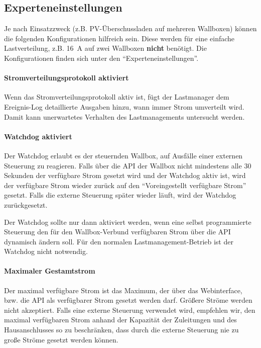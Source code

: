 \documentclass[a4paper,10pt]{article}
\newcommand{\hint}[1]{\begin{tcolorbox}[colback=boxgray,colframe=black,coltext=
white,title=Hinweis,left*=2mm,right*=2mm,boxsep=1mm,bottom=1mm,top=1mm]#1\end{tcolorbox}}
\begin{document}
\begin{multicols*}{2}
    \vspace{-0.2cm}
    \subsection{Experteneinstellungen}
    \vspace{-0.1cm}
    Je nach Einsatzzweck (z.B. PV-Überschussladen auf mehreren Wallboxen) können die folgenden Konfigurationen hilfreich sein.
    Diese werden für eine einfache Lastverteilung, z.B. \SI{16}{\ampere} auf zwei Wallboxen \textbf{nicht} benötigt.
    Die Konfigurationen finden sich unter den \enquote{Experteneinstellungen}.

    \vspace{-0.2cm}
    \paragraph{Stromverteilungsprotokoll aktiviert}
    Wenn das Stromverteilungsprotokoll aktiv ist, fügt der Lastmanager dem Ereignis-Log detaillierte Ausgaben hinzu, wann immer Strom umverteilt wird. Damit kann unerwartetes Verhalten des
    Lastmanagements untersucht werden.

    \vspace{-0.2cm}
    \paragraph{Watchdog aktiviert}
    Der Watchdog erlaubt es der steuernden Wallbox, auf Ausfälle einer externen Steuerung zu reagieren. Falls über die API der Wallbox
    nicht mindestens alle 30 Sekunden der verfügbare Strom gesetzt wird und der Watchdog aktiv ist, wird der verfügbare Strom wieder zurück auf den
    \enquote{Voreingestellt verfügbare Strom} gesetzt. Falls die externe Steuerung später wieder läuft, wird der Watchdog zurückgesetzt.

    \hint{Der Watchdog sollte nur dann aktiviert werden,
    wenn eine selbst programmierte Steuerung den für den Wallbox-Verbund verfügbaren Strom über die API dynamisch ändern soll.
    Für den normalen Lastmanagement-Betrieb ist der Watchdog nicht notwendig.}

    \paragraph{Maximaler Gestamtstrom}
    Der maximal verfügbare Strom ist das Maximum, der über das Webinterface, bzw. die API als verfügbarer Strom gesetzt werden darf.
    Größere Ströme werden nicht akzeptiert. Falls eine externe Steuerung verwendet wird, empfehlen wir, den maximal verfügbaren Strom
    anhand der Kapazität der Zuleitungen und des Hausanschlusses so zu beschränken, dass durch die externe Steuerung nie zu große
    Ströme gesetzt werden können.


\end{multicols*}
\end{document}

